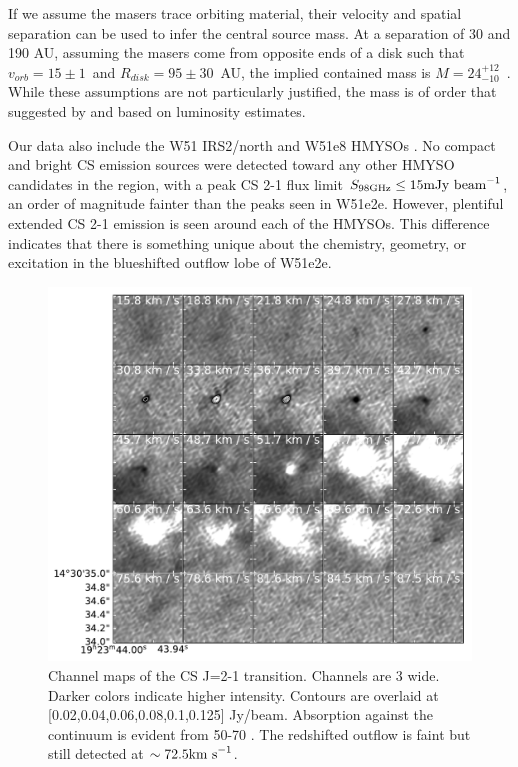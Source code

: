 \documentclass[twocolumn]{aastex62}
\begin{document}
If we assume the masers trace orbiting material, their velocity and spatial
separation can be used to infer the central source mass.  At a separation of 30
\kms and 190 AU, assuming the masers come from opposite ends of a disk such
that $v_{orb}=15\pm1$~\kms and $R_{disk}=95\pm30$~AU, the implied contained mass is
$M=24_{-10}^{+12}$~\msun.  While these assumptions are not particularly
justified, the mass is of order that suggested by \citet{Ginsburg2017a} and
\citet{Goddi2018a} based on luminosity estimates.


Our data also include the W51 IRS2/north and W51e8 HMYSOs
\citep{Ginsburg2017a}.  No compact and bright CS emission sources were detected
toward any other HMYSO candidates in the region, with a peak CS 2-1 flux limit
${S_{98 \mathrm{GHz}} \leq 15 \mathrm{mJy~\textrm{beam}^{-1}}}$, an order of magnitude
fainter than the peaks seen in W51e2e.  However, plentiful extended CS 2-1
emission is seen around each of the HMYSOs.  This difference indicates that
there is something unique about the chemistry, geometry, or excitation in the
blueshifted outflow lobe of W51e2e.


\begin{figure}
    \includegraphics[]{figures/CS_maser_channel_maps.pdf}
    \caption{Channel maps of the CS J=2-1 transition.  Channels are 3 \kms
    wide.  Darker colors indicate higher intensity.  Contours are overlaid at
    [0.02,0.04,0.06,0.08,0.1,0.125] Jy/beam.  Absorption against the continuum
    is evident from 50-70 \kms.  The redshifted outflow is faint but still
    detected at
    $\sim72.5\textrm{km~s}^{-1}$.
    }
    \label{fig:channelmaps}
\end{figure}
\end{document}
